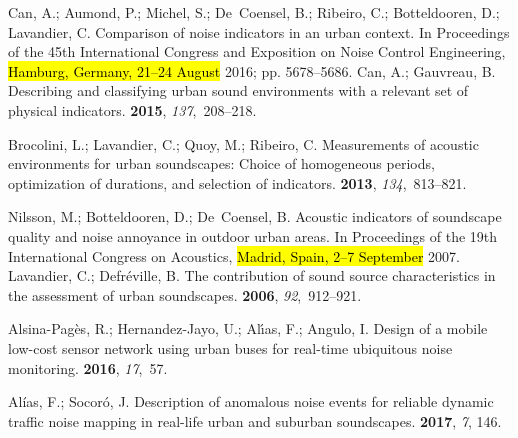 \documentclass[sensors,article,accept,moreauthors,pdftex,10pt,a4paper]{mdpi}
\begin{document}
\begin{thebibliography}{999}
Can, A.; Aumond, P.; Michel, S.; De~Coensel, B.; Ribeiro, C.; Botteldooren, D.;
  Lavandier, C.
\newblock Comparison of noise indicators in an urban context.
\newblock  In Proceedings of the 45th International Congress and Exposition on Noise Control
  Engineering, \hl{Hamburg, Germany, 21--24 August }2016; pp. 5678--5686.
Can, A.; Gauvreau, B.
\newblock Describing and classifying urban sound environments with a relevant
  set of physical indicators.
 {\bf 2015}, {\em 137},~208--218.

Brocolini, L.; Lavandier, C.; Quoy, M.; Ribeiro, C.
\newblock Measurements of acoustic environments for urban soundscapes: Choice
  of homogeneous periods, optimization of durations, and selection of
  indicators.
 {\bf 2013}, {\em 134},~813--821.

Nilsson, M.; Botteldooren, D.; De~Coensel, B.
\newblock Acoustic indicators of soundscape quality and noise annoyance in
  outdoor urban areas.
\newblock  In Proceedings of the 19th International Congress on Acoustics, \hl{Madrid, Spain, 2--7 September} 2007.
Lavandier, C.; Defr{\'e}ville, B.
\newblock The contribution of sound source characteristics in the assessment of
  urban soundscapes.
 {\bf 2006}, {\em
  92},~912--921.

Alsina-Pag{\`e}s, R.; Hernandez-Jayo, U.; Al{\'\i}as, F.; Angulo, I.
\newblock Design of a mobile low-cost sensor network using urban buses for
  real-time ubiquitous noise monitoring.
 {\bf 2016}, {\em 17},~57.

Alías, F.; Socoró, J.
\newblock Description of anomalous noise events for reliable dynamic traffic
  noise mapping in real-life urban and suburban soundscapes.
 {\bf 2017}, {\em 7}, 146.


\end{thebibliography}
\end{document}
